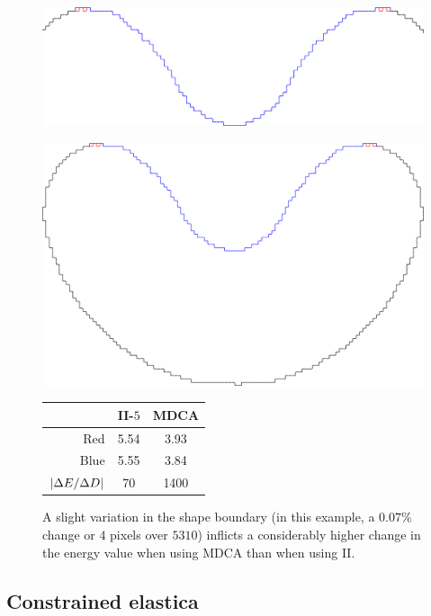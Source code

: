 \begin{figure}[]
\begin{minipage}[b]{0.6\textwidth}
\center
\includegraphics[scale=0.15]{figures/chapter5/mdca-sensitivity/closer-picture.pdf}
\end{minipage}%
\begin{minipage}[b]{0.4\textwidth}
\center
\includegraphics[scale=0.025]{figures/chapter5/mdca-sensitivity/big-picture.pdf}\\\vspace{2em}
\captionsetup{type=table}
\begin{tabular}{r|c|c}
& II-$5$ & MDCA \\
\hline
Red  & 5.54 & 3.93\\
Blue & 5.55 & 3.84\\
\hline
$| \Delta E / \Delta D |$ & 70 & 1400
\end{tabular}
\end{minipage}
\caption{A slight variation in the shape boundary (in this example, a $0.07\%$ change or $4$ pixels over $5310$) inflicts a considerably higher change in the energy value when using MDCA than when using II. }
\label{fig:mdca-sensitivity}
\end{figure}

\subsection{Constrained elastica}
\label{ch5:subsec:constrained-digital-elastica}

